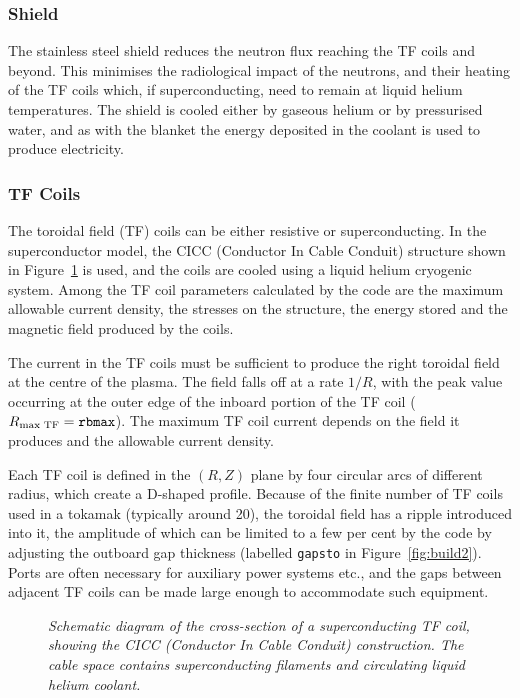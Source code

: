\documentclass[11pt,a4paper]{report}
\begin{document}
\subsubsection{Shield}
The stainless steel shield reduces the neutron flux reaching the TF coils and
beyond. This minimises the radiological impact of the neutrons, and their
heating of the TF coils which, if superconducting, need to remain at liquid
helium temperatures. The shield is cooled either by gaseous helium or by
pressurised water, and as with the blanket the energy deposited in the coolant
is used to produce electricity.

\subsubsection{TF Coils}
The toroidal field (TF) coils can be either resistive or superconducting. In
the superconductor model, the CICC (Conductor In Cable Conduit) structure
shown in Figure~\ref{fig:CICC} is used, and the coils are cooled using a
liquid helium cryogenic system. Among the TF coil parameters calculated by the
code are the maximum allowable current density, the stresses on the structure,
the energy stored and the magnetic field produced by the coils.

The current in the TF coils must be sufficient to produce the right toroidal
field at the centre of the plasma. The field falls off at a rate $1/R$, with
the peak value occurring at the outer edge of the inboard portion of the TF
coil ($R_{\mbox{\scriptsize max TF}} = \mbox{\tt rbmax}$). The maximum TF coil
current depends on the field it produces and the allowable current density.

Each TF coil is defined in the $(R,Z)$ plane by four circular arcs of
different radius, which create a D-shaped profile. Because of the finite
number of TF coils used in a tokamak (typically around 20), the toroidal field
has a ripple introduced into it, the amplitude of which can be limited to a
few per cent by the code by adjusting the outboard gap thickness (labelled
{\tt gapsto} in Figure~\ref{fig:build2}).  Ports are often necessary for
auxiliary power systems etc., and the gaps between adjacent TF coils can be
made large enough to accommodate such equipment.

\begin{figure}
\centerline{}
\vspace{-12mm}
\caption[CICC]
{\it Schematic diagram of the cross-section of a superconducting TF coil,
showing the CICC (Conductor In Cable Conduit) construction. The cable space
contains superconducting filaments and circulating liquid helium coolant.}
\label{fig:CICC}
\end{figure}
\end{document}
